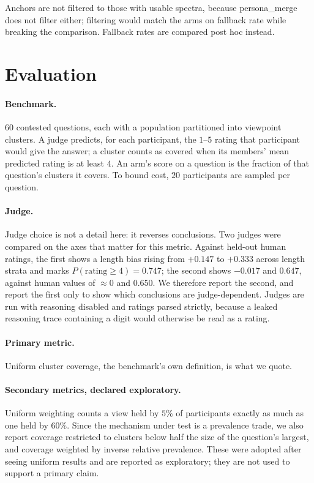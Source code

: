 \documentclass[11pt]{article}
\theoremstyle{definition}
\begin{document}
Anchors are not filtered to those with usable spectra, because persona\_merge
does not filter either; filtering would match the arms on fallback rate while
breaking the comparison. Fallback rates are compared post hoc instead.

\section{Evaluation}
\label{sec:eval}

\paragraph{Benchmark.} $60$ contested questions, each with a population
partitioned into viewpoint clusters. A judge predicts, for each participant, the
$1$--$5$ rating that participant would give the answer; a cluster counts as
covered when its members' mean predicted rating is at least $4$. An arm's score
on a question is the fraction of that question's clusters it covers. To bound
cost, $20$ participants are sampled per question.

\paragraph{Judge.} Judge choice is not a detail here: it reverses conclusions.
Two judges were compared on the axes that matter for this metric. Against
held-out human ratings, the first shows a length bias rising from $+0.147$ to
$+0.333$ across length strata and marks $P(\text{rating} \ge 4) = 0.747$; the
second shows $-0.017$ and $0.647$, against human values of $\approx 0$ and
$0.650$. We therefore report the second, and report the first only to show which
conclusions are judge-dependent. Judges are run with reasoning disabled and
ratings parsed strictly, because a leaked reasoning trace containing a digit
would otherwise be read as a rating.

\paragraph{Primary metric.} Uniform cluster coverage, the benchmark's own
definition, is what we quote.

\paragraph{Secondary metrics, declared exploratory.} Uniform weighting counts a
view held by $5\%$ of participants exactly as much as one held by $60\%$. Since
the mechanism under test is a prevalence trade, we also report coverage
restricted to clusters below half the size of the question's largest, and
coverage weighted by inverse relative prevalence. These were adopted after
seeing uniform results and are reported as exploratory; they are not used to
support a primary claim.
\end{document}
